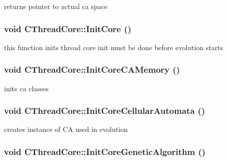 returns pointer to actual ca space \hypertarget{classCThreadCore_a585fd3734edc146086bc42187fd56bc6}{
\subsubsection[{InitCore}]{\setlength{\rightskip}{0pt plus 5cm}void CThreadCore::InitCore ()}}
\label{classCThreadCore_a585fd3734edc146086bc42187fd56bc6}
this function inits thread core init must be done before evolution starts \hypertarget{classCThreadCore_a6cc4724d18c05cd2d06833c986cc569d}{
\subsubsection[{InitCoreCAMemory}]{\setlength{\rightskip}{0pt plus 5cm}void CThreadCore::InitCoreCAMemory ()}}
\label{classCThreadCore_a6cc4724d18c05cd2d06833c986cc569d}
inits ca classes \hypertarget{classCThreadCore_a1dc7525d74dba3c1fa0a94057596c0a2}{
\subsubsection[{InitCoreCellularAutomata}]{\setlength{\rightskip}{0pt plus 5cm}void CThreadCore::InitCoreCellularAutomata ()}}
\label{classCThreadCore_a1dc7525d74dba3c1fa0a94057596c0a2}
creates instance of CA used in evolution \hypertarget{classCThreadCore_ad0bfe748e42ad65bbe82df1070c8c95e}{
\subsubsection[{InitCoreGeneticAlgorithm}]{\setlength{\rightskip}{0pt plus 5cm}void CThreadCore::InitCoreGeneticAlgorithm ()}}
